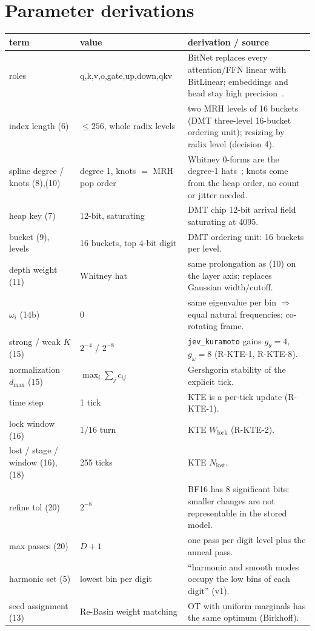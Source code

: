 \documentclass[11pt]{article}
\begin{document}
\appendix
\section{Parameter derivations}\label{app:params}
\begin{longtable}{p{3.2cm}p{2.6cm}p{9.2cm}}\toprule
term&value&derivation / source\\\midrule\endhead
roles&q,k,v,o,gate,up,down,qkv&BitNet replaces every attention/FFN linear with BitLinear; embeddings and head stay high precision~\cite{bitnet2b4t}.\\
index length (6)&$\le256$, whole radix levels&two MRH levels of 16 buckets (DMT three-level 16-bucket ordering unit); resizing by radix level (decision 4).\\
spline degree / knots (8),(10)&degree 1, knots $=$ MRH pop order&Whitney 0-forms are the degree-1 hats~\cite{afw}; knots come from the heap order, no count or jitter needed.\\
heap key (7)&12-bit, saturating&DMT chip 12-bit arrival field saturating at 4095.\\
bucket (9), levels&16 buckets, top 4-bit digit&DMT ordering unit: 16 buckets per level.\\
depth weight (11)&Whitney hat&same prolongation as (10) on the layer axis; replaces Gaussian width/cutoff.\\
$\omega_i$ (14b)&0&same eigenvalue per bin $\Rightarrow$ equal natural frequencies; co-rotating frame.\\
strong / weak $K$ (15)&$2^{-4}$ / $2^{-8}$&\texttt{jev\_kuramoto} gains $g_\theta=4$, $g_\omega=8$ (R-KTE-1, R-KTE-8).\\
normalization $d_{\max}$ (15)&$\max_i\sum_jc_{ij}$&Gershgorin stability of the explicit tick.\\
time step&1 tick&KTE is a per-tick update (R-KTE-1).\\
lock window (16)&$1/16$ turn&KTE $W_{\mathrm{lock}}$ (R-KTE-2).\\
lost / stage / window (16),(18)&255 ticks&KTE $N_{\mathrm{lost}}$.\\
refine tol (20)&$2^{-8}$&BF16 has 8 significant bits: smaller changes are not representable in the stored model.\\
max passes (20)&$D+1$&one pass per digit level plus the anneal pass.\\
harmonic set (5)&lowest bin per digit&``harmonic and smooth modes occupy the low bins of each digit'' (v1).\\
seed assignment (13)&Re-Basin weight matching&OT with uniform marginals has the same optimum (Birkhoff).\\

\end{longtable}
\end{document}
